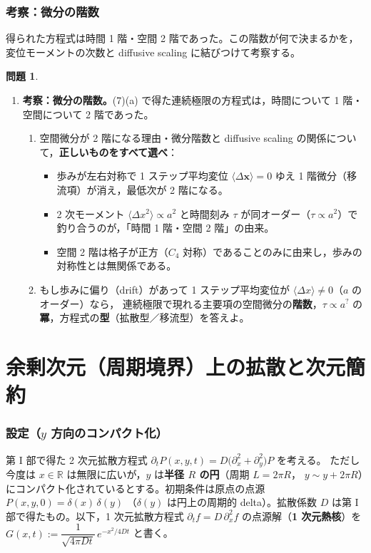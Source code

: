 \documentclass[dvipdfmx, uplatex]{jsarticle}
\newcommand{\bx}{\bm{x}}
\theoremstyle{definition}
\newtheorem*{prob}{問題}
\begin{document}
\section{考察：微分の階数}
得られた方程式は時間 1 階・空間 2 階であった。この階数が何で決まるかを，変位モーメントの次数と
diffusive scaling に結びつけて考察する。

\begin{prob}
\begin{enumerate}[start=9]
\item \textbf{考察：微分の階数。}(7)(a) で得た連続極限の方程式は，時間について 1 階・空間について 2 階であった。
\begin{enumerate}
\item 空間微分が 2 階になる理由・微分階数と diffusive scaling の関係について，\textbf{正しいものをすべて選べ}：
\begin{itemize}\setlength{\itemsep}{1pt}
\item[(あ)] 歩みが左右対称で 1 ステップ平均変位 $\langle\Delta\bx\rangle=0$ ゆえ 1 階微分（移流項）が消え，最低次が 2 階になる。
\item[(い)] 2 次モーメント $\langle\Delta x^2\rangle\propto a^2$ と時間刻み $\tau$ が同オーダー（$\tau\propto a^2$）で釣り合うのが，「時間 1 階・空間 2 階」の由来。
\item[(う)] 空間 2 階は格子が正方（$C_4$ 対称）であることのみに由来し，歩みの対称性とは無関係である。
\end{itemize}
\item もし歩みに偏り（drift）があって 1 ステップ平均変位が $\langle\Delta x\rangle\neq0$（$a$ のオーダー）なら，
連続極限で現れる主要項の空間微分の\textbf{階数}，$\tau\propto a^{?}$ の\textbf{冪}，方程式の\textbf{型}（拡散型／移流型）を答えよ。
\end{enumerate}
\end{enumerate}
\end{prob}

\part{余剰次元（周期境界）上の拡散と次元簡約}

\section{設定（$y$ 方向のコンパクト化）}
第 I 部で得た 2 次元拡散方程式 $\partial_t P(x,y,t)=D\bigl(\partial_x^2+\partial_y^2\bigr)P$ を考える。
ただし今度は $x\in\mathbb{R}$ は無限に広いが，$y$ は\textbf{半径 $R$ の円}（周期 $L=2\pi R$，
$y\sim y+2\pi R$）にコンパクト化されているとする。初期条件は原点の点源 $P(x,y,0)=\delta(x)\,\delta(y)$
（$\delta(y)$ は円上の周期的 delta）。拡散係数 $D$ は第 I 部で得たもの。以下，1 次元拡散方程式
$\partial_t f=D\,\partial_x^2 f$ の点源解（\textbf{1 次元熱核}）を
$G(x,t):=\dfrac{1}{\sqrt{4\pi Dt}}\,e^{-x^2/4Dt}$ と書く。
\end{document}
